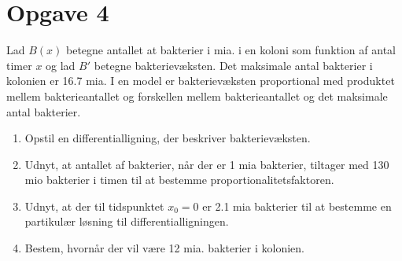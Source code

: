 \section*{Opgave 4}
Lad $B(x)$ betegne antallet at bakterier i mia. i en koloni som funktion af antal timer $x$ og lad $B'$ betegne bakterievæksten. Det maksimale antal bakterier i kolonien er 16.7 mia. I en model er bakterievæksten proportional med produktet mellem bakterieantallet og forskellen mellem bakterieantallet og det maksimale antal bakterier.
\begin{enumerate}[label=\roman*)]
	\item Opstil en differentialligning, der beskriver bakterievæksten.
	\item Udnyt, at antallet af bakterier, når der er 1 mia bakterier, tiltager med 130 mio bakterier i timen til at bestemme proportionalitetsfaktoren.
	\item Udnyt, at der til tidspunktet $x_0 = 0$ er 2.1 mia bakterier til at bestemme en partikulær løsning til differentialligningen.
	\item Bestem, hvornår der vil være 12 mia. bakterier i kolonien.
\end{enumerate}
